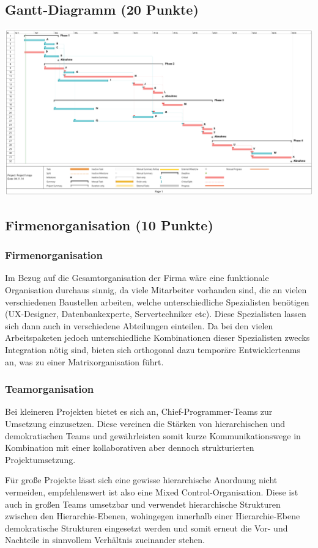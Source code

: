 \documentclass{scrartcl}
\begin{document}
\subsection{Gantt-Diagramm (20 Punkte)}

 \includegraphics[width=\linewidth]{gantt.pdf}


\subsection{Firmenorganisation (10 Punkte)}
\subsubsection*{Firmenorganisation}

Im Bezug auf die Gesamtorganisation der Firma wäre eine funktionale Organisation
durchaus sinnig, da viele Mitarbeiter vorhanden sind, die an vielen
verschiedenen Baustellen arbeiten, welche unterschiedliche Spezialisten
benötigen (UX-Designer, Datenbankexperte, Servertechniker etc). Diese
Spezialisten lassen sich dann auch in verschiedene Abteilungen einteilen. Da bei den
vielen Arbeitspaketen jedoch unterschiedliche Kombinationen dieser Spezialisten
zwecks Integration nötig sind, bieten sich orthogonal dazu temporäre
Entwicklerteams an, was zu einer Matrixorganisation führt.

\subsubsection*{Teamorganisation}
Bei kleineren Projekten bietet es
sich an, Chief-Programmer-Teams zur Umsetzung einzusetzen. Diese vereinen die
Stärken von hierarchischen und demokratischen Teams und gewährleisten somit
kurze Kommunikationswege in Kombination mit einer kollaborativen aber dennoch
strukturierten Projektumsetzung.

Für große Projekte lässt sich eine gewisse hierarchische Anordnung nicht
vermeiden, empfehlenswert ist also eine Mixed Control-Organisation. Diese ist
auch in großen Teams umsetzbar und verwendet hierarchische Strukturen zwischen
den Hierarchie-Ebenen, wohingegen innerhalb einer Hierarchie-Ebene demokratische
Strukturen eingesetzt werden und somit erneut die Vor- und Nachteile in
sinnvollem Verhältnis zueinander stehen.
\end{document}
